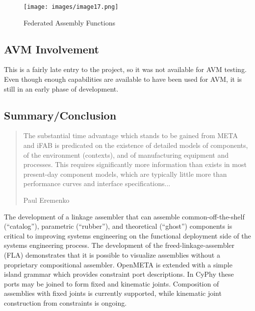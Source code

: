 \documentclass[]{report}
\begin{document}
\begin{figure}[h!]
	\centering
	\texttt{[image: images/image17.png]}
	\caption{Federated Assembly Functions}
	\label{fig:federated-metalink}
\end{figure}

\subsection{AVM Involvement}

This is a fairly late entry to the project, so it was not available for AVM testing.  
Even though enough capabilities are available to have been used for AVM, it is still in an early phase of development.

\subsection{Summary/Conclusion} 

\blockquote[Paul Eremenko]{
The substantial time advantage which stands to be gained from META and iFAB is 
predicated on the existence of detailed models of components, of the environment (contexts),
and of manufacturing equipment and processes. 
This requires significantly more information than exists in most present-day component models, 
which are typically little more than performance curves and interface specifications...}.
 
The development of a linkage assembler that can assemble 
common-off-the-shelf  (“catalog”), parametric (“rubber”), and 
theoretical (“ghost”) components is critical to improving systems engineering 
on the functional deployment side of the systems engineering process. 
The development of the freed-linkage-assembler (FLA) demonstrates that it is 
possible to visualize assemblies without a proprietary compositional assembler. 
OpenMETA is extended with a simple island grammar which provides constraint port descriptions.  
In CyPhy these ports may be joined to form fixed and kinematic joints. 
Composition of assemblies with fixed joints is currently supported, while kinematic joint construction from constraints is ongoing.


\end{document}
